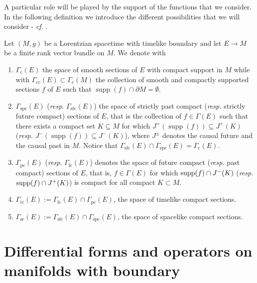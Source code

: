  A particular role will be played by the support of the functions that we consider. In the following definition we introduce the different possibilities that we will consider - \textit{cf.} \cite{Baer-15}.
\begin{Definition}\label{Def: space of forms}
	Let $(M,g)$ be a Lorentzian spacetime with timelike boundary and let $ E\to M$ be a finite rank vector bundle on $M$. We denote with 
	\begin{enumerate}
		\item 	$ \Gamma_{\mathrm{c}}(E)$ the space of smooth sections of $ E$ with compact support in $M$ while with $ \Gamma_{\mathrm{cc}}(E)\subset \Gamma_{\mathrm{c}}(M)$ the collection of smooth and compactly supported sections $ f$  of $ E$ such that $\operatorname{supp}( f)\cap\partial M=\emptyset$.
		\item
		$ \Gamma_{\mathrm{spc}}(E)$ (\textit{resp}. $ \Gamma_{\mathrm{sfc}}(E)$) the space of strictly past compact (\textit{resp.} strictly future compact) sections of $ E$, that is the collection of $ f\in \Gamma(E)$ such that there exists a compact set $K\subseteq M$ for which $J^+(\operatorname{supp}( f))\subseteq J^+(K)$ (\textit{resp.} $J^-(\operatorname{supp}( f))\subseteq J^-(K)$), where $J^\pm$ denotes the causal future and the causal past in $M$.  Notice that $ \Gamma_{\mathrm{sfc}}(E)\cap \Gamma_{\mathrm{spc}}(E)= \Gamma_{\mathrm{c}}(E)$.
		\item
		$ \Gamma_{\mathrm{pc}}(E)$ (\textit{resp}. $ \Gamma_{\mathrm{fc}}(E)$) denotes the space of future compact (\textit{resp.} past compact) sections of $ E$, that is, $ f\in \Gamma(E)$ for which
		${\rm supp}( f)\cap J^-(K)$ (\textit{resp.} ${\rm supp}( f)\cap J^+(K)$) is compact for all compact $K\subset M$.
		\item $ \Gamma_{\mathrm{tc}}(E):= \Gamma_{\mathrm{fc}}(E)\cap \Gamma_{\mathrm{pc}}(E)$, the space of timelike compact sections.
		\item $ \Gamma_{\mathrm{sc}}(E):= \Gamma_{\mathrm{sfc}}(E)\cap \Gamma_{\mathrm{spc}}(E)$, the space of spacelike compact sections.
	\end{enumerate}
\end{Definition}


\section{Differential forms and operators on manifolds with boundary}\label{Sec: Differential forms}

